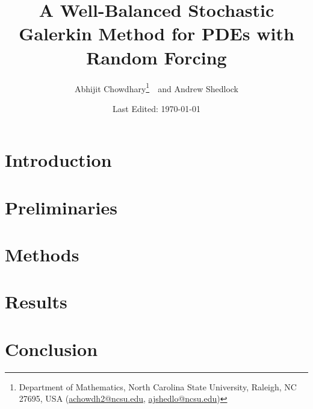 \documentclass[12pt]{article}
\begin{document}
\title{
  A Well-Balanced Stochastic Galerkin Method for PDEs with Random Forcing
}
\author{%
  Abhijit Chowdhary\footnote{%
    Department of Mathematics, North Carolina State University, Raleigh, NC
    27695, USA (\url{achowdh2@ncsu.edu}, \url{ajshedlo@ncsu.edu})
  }\ \ 
  and Andrew Shedlock\footnotemark[1]
}
\date{Last Edited: \today}
\maketitle
\tableofcontents

\clearpage

\section{Introduction}
\cite{Jin2015}

\section{Preliminaries}

\section{Methods}

\section{Results}

\section{Conclusion}

\printbibliography
\end{document}
